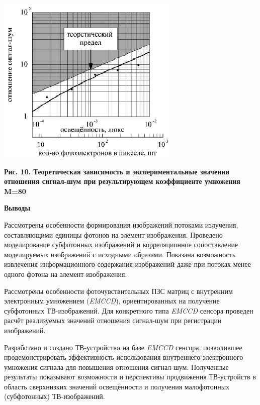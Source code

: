 \documentclass[11pt]{article}
\begin{document}
\includegraphics[width=0.8\linewidth]{15.png}
\begin{center}
\textbf{Рис. 10. Теоретическая зависимость и экспериментальные значения отношения сигнал-шум при результирующем коэффициенте умножения M=80}
\end{center}

\begin{center}
\textbf{Выводы}
\end{center}

Рассмотрены особенности формирования изображений потоками излучения,
составляющими единицы фотонов на элемент изображения. Проведено моделирование субфотонных изображений и корреляционное сопоставление моделируемых изображений с исходными образами. Показана возможность извлечения информационного содержания изображений даже при потоках менее одного фотона на элемент изображения.

Рассмотрены особенности фоточувствительных ПЗС матриц с внутренним
электронным умножением (\textit{EMCCD}), ориентированных на получение субфотонных ТВ-изображений. Для конкретного типа \textit{EMCCD} сенсора проведен расчёт реализуемых значений отношения сигнал-шум при регистрации изображений. 

Разработано и создано ТВ-устройство на базе \textit{EMCCD} сенсора, позволившее продемонстрировать эффективность использования внутреннего электронного умножения сигнала для повышения отношения сигнал-шум. Полученные результаты показывают возможности и перспективы продвижения ТВ-устройств в область сверхнизких значений освещённости и получения малофотонных (субфотонных) ТВ-изображений.
\end{document}
